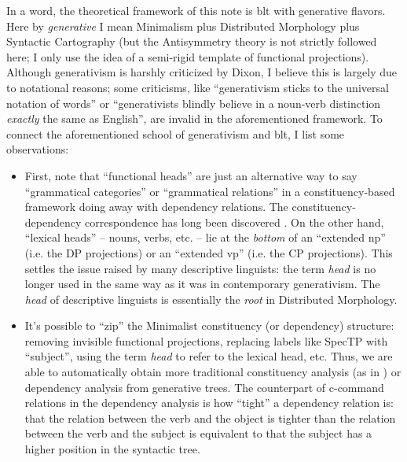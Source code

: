 \documentclass[a4paper, oneside]{report}
\newcommand*{\term}[1]{\emph{#1}}
\begin{document}
In a word, the theoretical framework of this note 
is \ac{blt}\citep{dixon2009basic1,dixon2010basic2,dixon2012basic3}
with generative flavors.
Here by \term{generative} I mean 
Minimalism plus Distributed Morphology plus Syntactic Cartography 
(but the Antisymmetry theory is not strictly followed here; 
I only use the idea of a semi-rigid template of functional projections).
Although generativism is harshly criticized by Dixon, 
I believe this is largely due to notational reasons;
some criticisms, like ``generativism sticks to the universal notation of words''
or ``generativists blindly believe in a 
noun-verb distinction \emph{exactly} the same as English'',
are invalid in the aforementioned framework. 
To connect the aforementioned school of generativism and \ac{blt}, 
I list some observations:
\begin{itemize}
    \item First, note that ``functional heads'' are just 
        an alternative way to say ``grammatical categories'' or ``grammatical relations''
        in a constituency-based framework doing away with dependency relations.
        The constituency-dependency correspondence 
        has long been discovered 
        \citep{schneider1998linguistic,osborne2011bare,kahane2015syntactic,nefdt2023notational}. 
        On the other hand, 
        ``lexical heads'' -- nouns, verbs, etc. -- 
        lie at the \emph{bottom} of an ``extended \ac{np}'' (i.e. the DP projections) 
        or an ``extended \ac{vp}'' (i.e. the CP projections).
        This settles the issue raised by many descriptive linguists: 
        the term \term{head} is no longer used in the same way 
        as it was in contemporary generativism.
        The \term{head} of descriptive linguists is essentially the \term{root} in Distributed Morphology.
    \item It's possible to ``zip'' the Minimalist constituency (or dependency) structure: 
        removing invisible functional projections, 
        replacing labels like SpecTP with ``subject'',
        using the term \term{head} to refer to the lexical head, etc.
        Thus, we are able to automatically 
        obtain more traditional constituency analysis (as in \citet{cgel})
        or dependency analysis 
        from generative trees. 
        The counterpart of c-command relations in the dependency analysis 
        is how ``tight'' a dependency relation is:
        that the relation between the verb and the object is tighter 
        than the relation between the verb and the subject 
        is equivalent to that the subject has a higher position in the syntactic tree.

\end{itemize}
\end{document}
